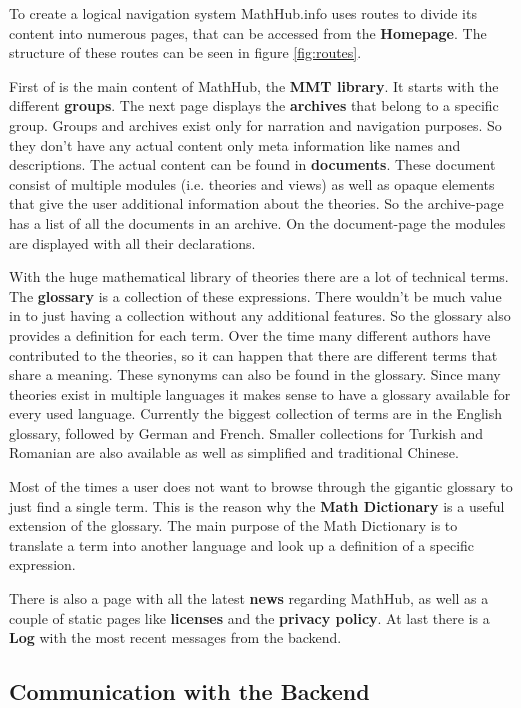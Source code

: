 \documentclass[11pt,a4paper]{article}
\begin{document}
To create a logical navigation system MathHub.info uses routes to divide its content into numerous pages, that can be accessed from the \textbf{Homepage}.
The structure of these routes can be seen in figure \ref{fig:routes}.

First of is the main content of MathHub, the \textbf{MMT library}.
It starts with the different \textbf{groups}.
The next page displays the \textbf{archives} that belong to a specific group.
Groups and archives exist only for narration and navigation purposes.
So they don't have any actual content only meta information like names and descriptions.
The actual content can be found in \textbf{documents}.
These document consist of multiple modules (i.e. theories and views) as well as opaque elements that give the user additional information about the theories.
So the archive-page has a list of all the documents in an archive.
On the document-page the modules are displayed with all their declarations.

With the huge mathematical library of theories there are a lot of technical terms.
The \textbf{glossary} is a collection of these expressions.
There wouldn't be much value in to just having a collection without any additional features.
So the glossary also provides a definition for each term.
Over the time many different authors have contributed to the theories, so it can happen that there are different terms that share a meaning.
These synonyms can also be found in the glossary.
Since many theories exist in multiple languages it makes sense to have a glossary available for every used language.
Currently the biggest collection of terms are in the English glossary, followed by German and French.
Smaller collections for Turkish and Romanian are also available as well as simplified and traditional Chinese.\cite{smglom}

Most of the times a user does not want to browse through the gigantic glossary to just find a single term.
This is the reason why the \textbf{Math Dictionary} is a useful extension of the glossary.
The main purpose of the Math Dictionary is to translate a term into another language and look up a definition of a specific expression.

There is also a page with all the latest \textbf{news} regarding MathHub, as well as a couple of static pages like \textbf{licenses} and the \textbf{privacy policy}.
At last there is a \textbf{Log} with the most recent messages from the backend.

\subsection{Communication with the Backend}
\end{document}
